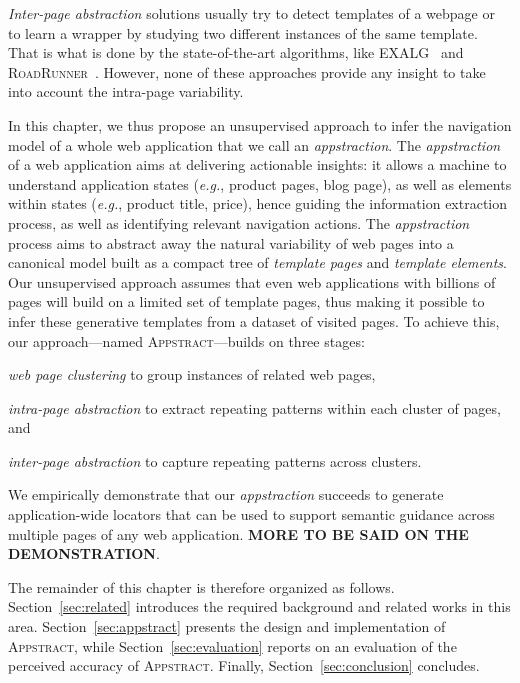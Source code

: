 \emph{Inter-page abstraction} solutions usually try to detect templates of a webpage or to learn a wrapper by studying two different instances of the same template.
That is what is done by the state-of-the-art algorithms, like EXALG~\cite{ArasuExtractingPages} and \textsc{RoadRunner}~\cite{Crescenzi2001RoadRunner:Sites}.
However, none of these approaches provide any insight to take into account the intra-page variability.

In this chapter, we thus propose an unsupervised approach to infer the navigation model of a whole web application that we call an \textit{appstraction}.
The \textit{appstraction} of a web application aims at delivering actionable insights: it allows a machine to understand application states (\emph{e.g.}, product pages, blog page), as well as elements within states (\emph{e.g.}, product title, price), hence guiding the information extraction process, as well as identifying relevant navigation actions.
The \textit{appstraction} process aims to abstract away the natural variability of web pages into a canonical model built as a compact tree of \emph{template pages} and \emph{template elements}.
Our unsupervised approach assumes that even web applications with billions of pages will build on a limited set of template pages, thus making it possible to infer these generative templates from a dataset of visited pages.
To achieve this, our approach---named \textsc{Appstract}---builds on three stages:
\begin{inparaenum}
    \item \textit{web page clustering} to group instances of related web pages,
    \item \textit{intra-page abstraction} to extract repeating patterns within each cluster of pages, and
    \item \textit{inter-page abstraction} to capture repeating patterns across clusters.
\end{inparaenum}

We empirically demonstrate that our \emph{appstraction} succeeds to generate application-wide locators that can be used to support semantic guidance across multiple pages of any web application.
\textbf{MORE TO BE SAID ON THE DEMONSTRATION}.

The remainder of this chapter is therefore organized as follows.
Section~\ref{sec:related} introduces the required background and related works in this area.
Section~\ref{sec:appstract} presents the design and implementation of \textsc{Appstract}, while Section~\ref{sec:evaluation} reports on an evaluation of the perceived accuracy of \textsc{Appstract}.
Finally, Section~\ref{sec:conclusion} concludes.

